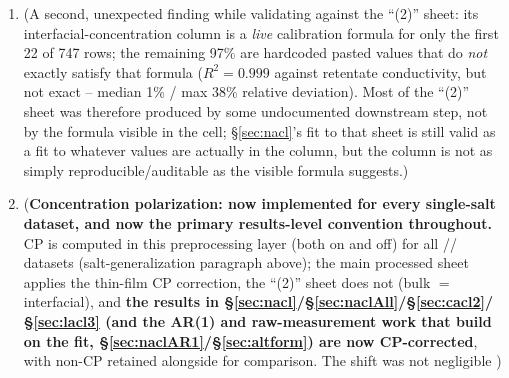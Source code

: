 \documentclass[11pt]{article}
\newcommand{\note}[1]{{\color{blue}\textsf{(#1)}}}
\begin{document}
\begin{enumerate}[itemsep=2pt]
{{    recorded at all}, so this per-experiment fit could not be independently
    checked against \emph{their} original calibrations --- only against the
    6 newly-processed raw-only runs. \textbf{A further nuance (likely important):}
    the vial-fit line (e.g.\ MC5 07.23.24: $\kappa=111+93\,c$) differs from the
    inline-applicable embedded curve ($\kappa=76.7\,c-64$) not only in slope
    ($\sim$20\%) but in \emph{intercept} ($\sim$+\SI{175}{\micro S/cm}). Because
    this vial-fit calibration is applied to the \emph{inline} retentate/permeate
    conductivity, the intercept offset biases the low-concentration end (where it
    dominates the $\sim$\SI{100}{\micro S/cm} early readings) --- a plausible driver
    of the raw-only runs' reconstruction noise. \emph{Open question for the team:}
    are the vial ``Conductivity @ Temp'' and the inline probe on the same
    instrument/scale? If not, a run's vials should not be used to calibrate its
    inline sensor. Full validation tables:
    \texttt{analysis/preprocessing/README.md}.}
  \item \note{A second, unexpected finding while validating against the
    ``(2)'' sheet: its interfacial-concentration column is a \emph{live}
    calibration formula for only the first 22 of 747 rows; the remaining
    97\% are hardcoded pasted values that do \emph{not} exactly satisfy
    that formula ($R^2=0.999$ against retentate conductivity, but not exact
    -- median 1\% / max 38\% relative deviation). Most of the ``(2)'' sheet
    was therefore produced by some undocumented downstream step, not by the
    formula visible in the cell; \S\ref{sec:nacl}'s fit to that sheet is
    still valid as a fit to whatever values are actually in the column, but
    the column is not as simply reproducible/auditable as the visible
    formula suggests.}
  \item \note{\textbf{Concentration polarization: now implemented for every
    single-salt dataset, and now the primary results-level convention
    throughout.} CP is computed in this preprocessing layer (both on and off)
    for all \ce{NaCl}/\ce{CaCl2}/\ce{LaCl3} datasets (salt-generalization
    paragraph above); the main processed sheet applies the thin-film CP
    correction, the ``(2)'' sheet does not (bulk $=$ interfacial), and
    \textbf{the results in
    \S\ref{sec:nacl}/\S\ref{sec:naclAll}/\S\ref{sec:cacl2}/\S\ref{sec:lacl3}
    (and the AR(1) and raw-measurement work that build on the \ce{NaCl} fit,
    \S\ref{sec:naclAR1}/\S\ref{sec:altform}) are now CP-corrected}, with
    non-CP retained alongside for comparison. The shift was not negligible
}
\end{enumerate}
\end{document}
